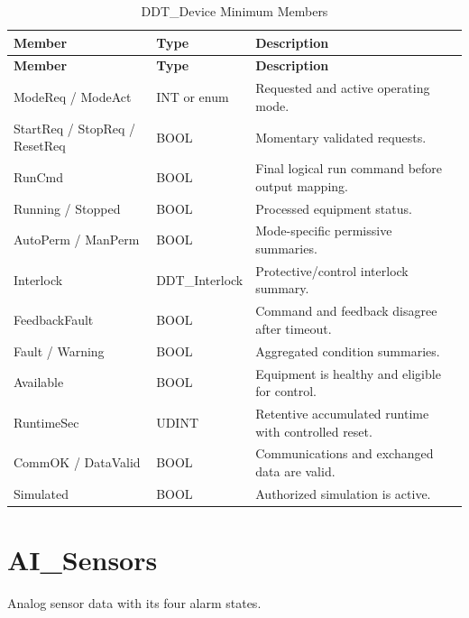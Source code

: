 \begin{longtable}{@{}P{4.29cm}P{3.90cm}P{8.71cm}@{}}
\caption{DDT\_Device Minimum Members}\label{tab:ddt-device}\\
\toprule {}\textbf{Member} & \textbf{Type} & \textbf{Description}\\ \midrule
\endfirsthead
\toprule {}\textbf{Member} & \textbf{Type} & \textbf{Description}\\ \midrule
\endhead
ModeReq / ModeAct & INT or enum & Requested and active operating mode.\\
StartReq / StopReq / ResetReq & BOOL & Momentary validated requests.\\
RunCmd & BOOL & Final logical run command before output mapping.\\
Running / Stopped & BOOL & Processed equipment status.\\
AutoPerm / ManPerm & BOOL & Mode-specific permissive summaries.\\
Interlock & DDT\_Interlock & Protective/control interlock summary.\\
FeedbackFault & BOOL & Command and feedback disagree after timeout.\\
Fault / Warning & BOOL & Aggregated condition summaries.\\
Available & BOOL & Equipment is healthy and eligible for control.\\
RuntimeSec & UDINT & Retentive accumulated runtime with controlled reset.\\
CommOK / DataValid & BOOL & Communications and exchanged data are valid.\\
Simulated & BOOL & Authorized simulation is active.\\
\bottomrule
\end{longtable}


\section{AI\_Sensors}
Analog sensor data with its four alarm states.

